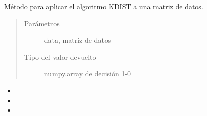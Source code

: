 \documentclass[letterpaper,10pt,spanish]{sphinxmanual}
\begin{document}

\begin{fulllineitems}
Método para aplicar el algoritmo KDIST a una matriz de datos.
\begin{quote}\begin{description}
\item[{Parámetros}] \leavevmode
{} \textendash{} data, matriz de datos

\item[{Tipo del valor devuelto}] \leavevmode
numpy.array de decisión 1-0

\end{description}\end{quote}

\end{fulllineitems}

\begin{itemize}
\item {} 

\item {} 

\item {} 

\end{itemize}



\renewcommand{\indexname}{Índice}
\printindex
\end{document}
